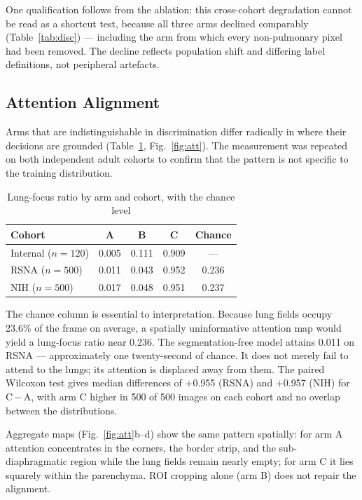 \documentclass[journal,twoside,web]{ieeecolor}
\begin{document}
One qualification follows from the ablation: this cross-cohort degradation cannot be read as a shortcut test, because all three arms declined comparably (Table~\ref{tab:disc}) --- including the arm from which every non-pulmonary pixel had been removed. The decline reflects population shift and differing label definitions, not peripheral artefacts.

\subsection{Attention Alignment}
\label{sec:res-lfr}

Arms that are indistinguishable in discrimination differ radically in where their decisions are grounded (Table~\ref{tab:lfr}, Fig.~\ref{fig:att}). The measurement was repeated on both independent adult cohorts to confirm that the pattern is not specific to the training distribution.

\begin{table}[!t]
\caption{Lung-focus ratio by arm and cohort, with the chance level}
\label{tab:lfr}
\centering
\small
\begin{tabular}{@{}lcccc@{}}
\toprule
\textbf{Cohort} & \textbf{A} & \textbf{B} & \textbf{C} & \textbf{Chance} \\
\midrule
Internal ($n=120$) & 0.005 & 0.111 & 0.909 & --- \\
RSNA ($n=500$) & 0.011 & 0.043 & 0.952 & 0.236 \\
NIH ($n=500$) & 0.017 & 0.048 & 0.951 & 0.237 \\
\bottomrule
\end{tabular}
\end{table}

The chance column is essential to interpretation. Because lung fields occupy 23.6\% of the frame on average, a spatially uninformative attention map would yield a lung-focus ratio near 0.236. The segmentation-free model attains 0.011 on RSNA --- approximately one twenty-second of chance. It does not merely fail to attend to the lungs; its attention is displaced away from them. The paired Wilcoxon test gives median differences of $+$0.955 (RSNA) and $+$0.957 (NIH) for C\,$-$\,A, with arm C higher in 500 of 500 images on each cohort and no overlap between the distributions.

Aggregate maps (Fig.~\ref{fig:att}b--d) show the same pattern spatially: for arm A attention concentrates in the corners, the border strip, and the sub-diaphragmatic region while the lung fields remain nearly empty; for arm C it lies squarely within the parenchyma. ROI cropping alone (arm B) does not repair the alignment.
\end{document}
